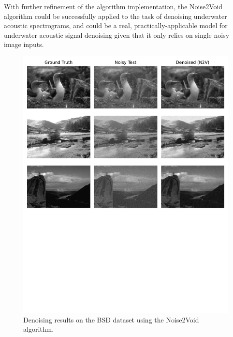 With further refinement of the algorithm implementation, the Noise2Void algorithm could be successfully applied to the task of denoising underwater acoustic spectrograms, and could be a real, practically-applicable model for underwater acoustic signal denoising given that it only relies on single noisy image inputs.


\begin{figure}[p]
    \centering
    \includegraphics[trim={0.5cm 10cm 0.5cm 0},clip,width=\linewidth]{img/ch6/future_work/n2v_comparison_bsd.pdf}
    \caption{Denoising results on the BSD dataset using the Noise2Void algorithm.}
    \label{fig:n2v-results-natural}
\end{figure}

